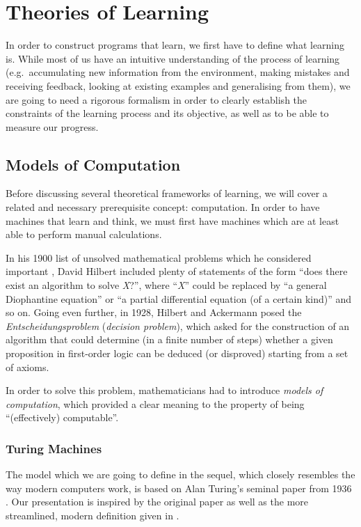 \chapter{Theories of Learning}

In order to construct programs that learn, we first have to define what learning is. While most of us have an intuitive understanding of the process of learning (e.g.\ accumulating new information from the environment, making mistakes and receiving feedback, looking at existing examples and generalising from them), we are going to need a rigorous formalism in order to clearly establish the constraints of the learning process and its objective, as well as to be able to measure our progress.

\section{Models of Computation}

Before discussing several theoretical frameworks of learning, we will cover a related and necessary prerequisite concept: computation. In order to have machines that learn and think, we must first have machines which are at least able to perform manual calculations.

In his 1900 list of unsolved mathematical problems which he considered important \cite{Hilbert1902_MathematicalProblems}, David Hilbert included plenty of statements of the form ``does there exist an algorithm to solve \emph{X}?'', where ``\emph{X}'' could be replaced by ``a general Diophantine equation'' or ``a partial differential equation (of a certain kind)'' and so on. Going even further, in 1928, Hilbert and Ackermann \cite[p.~119]{Hilbert1967} posed the \emph{Entscheidungsproblem} (\emph{decision problem}), which asked for the construction of an algorithm that could determine (in a finite number of steps) whether a given proposition in first-order logic can be deduced (or disproved) starting from a set of axioms.

In order to solve this problem, mathematicians had to introduce \emph{models of computation}, which provided a clear meaning to the property of being ``(effectively) computable''.

\subsection{Turing Machines}

The model which we are going to define in the sequel, which closely resembles the way modern computers work, is based on Alan Turing's seminal paper from 1936 \cite{Turing1936}. Our presentation is inspired by the original paper as well as the more streamlined, modern definition given in \cite{Homer2011}.

